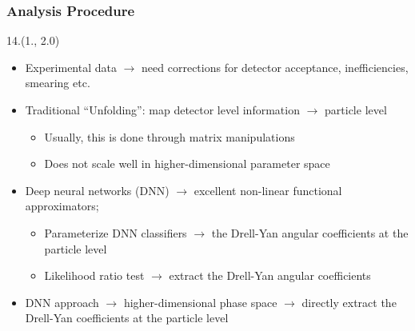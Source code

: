 \documentclass[12pt, xcolor={dvipsnames}, aspectratio = 169, sans,mathserif]{beamer}
\newenvironment{List}[2]
{\begin{textblock}{#1}#2
\begin{itemize}}
{\end{itemize}
\end{textblock}}
\begin{document}
\begin{frame}
\frametitle{Analysis Procedure}

\begin{List}{14.}{(1., 2.0)}

  \item Experimental data $\rightarrow$ need corrections for detector acceptance, inefficiencies, smearing etc.

  \item Traditional ``Unfolding'': map detector level information $\rightarrow$ particle level

  \begin{itemize}
    \item Usually, this is done through matrix manipulations

    \item Does not scale well in higher-dimensional parameter space
  \end{itemize}

  \item Deep neural networks (DNN) $\rightarrow$ excellent non-linear functional approximators;

  \begin{itemize}
    \item Parameterize DNN classifiers $\rightarrow$ the Drell-Yan angular coefficients at the particle level

    \item Likelihood ratio test $\rightarrow$ extract the Drell-Yan angular coefficients
  \end{itemize}

  \item DNN approach $\rightarrow$ higher-dimensional phase space $\rightarrow$ directly extract the Drell-Yan coefficients at the particle level

\end{List}
\end{frame}
\end{document}
